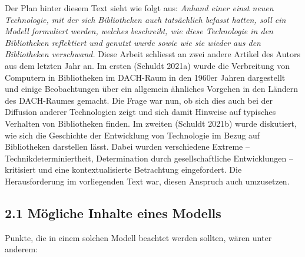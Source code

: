 \documentclass[a4paper,
fontsize=11pt,
oneside,
numbers=noperiodatend,
parskip=half-,
bibliography=totoc,
final
]{scrartcl}
\begin{document}
Der Plan hinter diesem Text sieht wie folgt aus: \emph{Anhand einer
einst neuen Technologie, mit der sich Bibliotheken auch tatsächlich
befasst hatten, soll ein Modell formuliert werden, welches beschreibt,
wie diese Technologie in den Bibliotheken reflektiert und genutzt wurde
sowie wie sie wieder aus den Bibliotheken verschwand.} Diese Arbeit
schliesst an zwei andere Artikel des Autors aus dem letzten Jahr an. Im
ersten (Schuldt 2021a) wurde die Verbreitung von Computern in
Bibliotheken im DACH-Raum in den 1960er Jahren dargestellt und einige
Beobachtungen über ein allgemein ähnliches Vorgehen in den Ländern des
DACH-Raumes gemacht. Die Frage war nun, ob sich dies auch bei der
Diffusion anderer Technologien zeigt und sich damit Hinweise auf
typisches Verhalten von Bibliotheken finden. Im zweiten (Schuldt 2021b)
wurde diskutiert, wie sich die Geschichte der Entwicklung von
Technologie im Bezug auf Bibliotheken darstellen lässt. Dabei wurden
verschiedene Extreme -- Technikdeterminiertheit, Determination durch
gesellschaftliche Entwicklungen -- kritisiert und eine kontextualisierte
Betrachtung eingefordert. Die Herausforderung im vorliegenden Text war,
diesen Anspruch auch umzusetzen.

\hypertarget{muxf6gliche-inhalte-eines-modells}{%
\subsection{2.1 Mögliche Inhalte eines
Modells}\label{muxf6gliche-inhalte-eines-modells}}

Punkte, die in einem solchen Modell beachtet werden sollten, wären unter
anderem:
\end{document}
